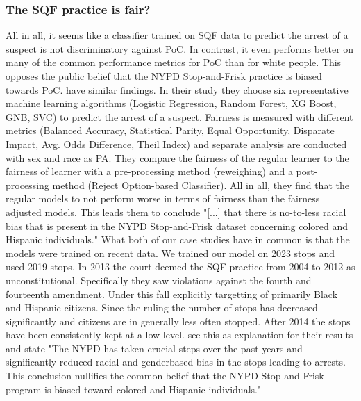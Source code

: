 \subsubsection*{The SQF practice is fair?}
All in all, it seems like a classifier trained on SQF data to predict the arrest of a suspect is not discriminatory against PoC. In contrast, it even performs better on many of the common performance metrics for PoC than for white people. This opposes the public belief that the NYPD Stop-and-Frisk practice is biased towards PoC. \cite{Badr2022DTFANSP} have similar findings.
In their study they choose six representative machine learning algorithms (Logistic Regression, Random Forest, XG Boost, GNB, SVC) to predict the arrest of a suspect. Fairness is measured with different metrics (Balanced Accuracy, Statistical Parity, Equal Opportunity, Disparate Impact, Avg. Odds Difference, Theil Index) and separate analysis are conducted with sex and race as PA.
They compare the fairness of the regular learner to the fairness of learner with a pre-processing method (reweighing) and a post-processing method (Reject Option-based Classifier). All in all, they find that the regular models to not perform worse in terms of fairness than the fairness adjusted models. This leads them to conclude "[...] that there is no-to-less racial bias that is present in the NYPD Stop-and-Frisk dataset concerning colored and Hispanic individuals."
What both of our case studies have in common is that the models were trained on recent data. We trained our model on 2023 stops and \cite{Badr2022DTFANSP} used 2019 stops. In 2013 the court deemed the SQF practice from 2004 to 2012 as unconstitutional. Specifically they saw violations against the fourth and fourteenth amendment. Under this fall explicitly targetting of primarily Black and Hispanic citizens. Since the ruling the number of stops has decreased significantly and citizens are in generally less often stopped. After 2014 the stops have been consistently kept at a low level.
\cite{Badr2022DTFANSP} see this as explanation for their results and state "The NYPD has taken crucial steps over the past years and significantly reduced racial and genderbased bias in the stops leading to arrests. This conclusion nullifies the common belief that the NYPD Stop-and-Frisk program is biased toward colored and Hispanic individuals." 


